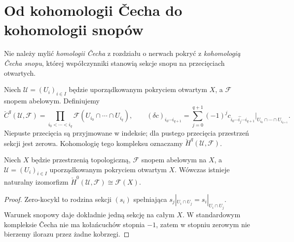 \section{Od kohomologii \v{C}echa do kohomologii snopów}
\label{sec:cech-sheaves-v12}
Nie należy mylić \emph{homologii \v{C}echa} z rozdziału o
nerwach pokryć z \emph{kohomologią \v{C}echa snopu}, której
współczynniki stanowią sekcje snopu na przecięciach otwartych.

\begin{definicja}
Niech $\mathcal U=(U_i)_{i\in I}$ będzie uporządkowanym pokryciem
otwartym $X$, a $\mathcal F$ snopem abelowym. Definiujemy
\[
\check C^q(\mathcal U,\mathcal F)
=\prod_{i_0<\cdots<i_q}\mathcal F(U_{i_0}\cap\cdots\cap U_{i_q}),
\qquad
(\delta c)_{i_0\cdots i_{q+1}}
=\sum_{j=0}^{q+1}(-1)^j
c_{i_0\cdots\widehat{i_j}\cdots i_{q+1}}
\big|_{U_{i_0}\cap\cdots\cap U_{i_{q+1}}}.
\]
Niepuste przecięcia są przyjmowane w indeksie; dla pustego
przecięcia przestrzeń sekcji jest zerowa. Kohomologię tego
kompleksu oznaczamy $\check H^q(\mathcal U,\mathcal F)$.
\end{definicja}

\begin{stwierdzenie}
Niech $X$ będzie przestrzenią topologiczną,
$\mathcal F$ snopem abelowym na $X$,
a $\mathcal U=(U_i)_{i\in I}$ uporządkowanym pokryciem otwartym $X$.
Wówczas istnieje naturalny izomorfizm
$\check H^0(\mathcal U,\mathcal F)\cong\mathcal F(X)$.
\end{stwierdzenie}
\begin{proof}
Zero-kocykl to rodzina sekcji $(s_i)$ spełniająca
$s_j|_{U_i\cap U_j}=s_i|_{U_i\cap U_j}$.
Warunek snopowy daje dokładnie jedną sekcję na całym $X$.
W standardowym kompleksie \v{C}echa nie ma kołańcuchów stopnia $-1$,
zatem w stopniu zerowym nie bierzemy ilorazu przez żadne kobrzegi.
\end{proof}

